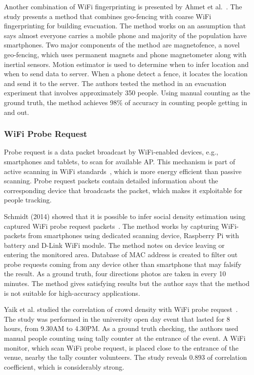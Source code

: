 	Another combination of WiFi fingerprinting is presented by Ahmet et al.~\cite{thesis045}. The study presents a method that combines geo-fencing with coarse WiFi fingerprinting for building evacuation. The method works on an assumption that says almost everyone carries a mobile phone and majority of the population have smartphones. Two major components of the method are magnetofence, a novel geo-fencing, which uses permanent magnets and phone magnetometer along with inertial sensors. Motion estimator is used to determine when to infer location and when to send data to server. When a phone detect a fence, it locates the location and send it to the server. The authors tested the method in an evacuation experiment that involves approximately 350 people. Using manual counting as the ground truth, the method achieves 98\% of accuracy in counting people getting in and out.
	


	\subsubsection{WiFi Probe Request} %
	\label{ssub:wifi_probe_request}
	Probe request is a data packet broadcast by WiFi-enabled devices, e.g., smartphones and tablets, to scan for available \ac{AP}. This mechanism is part of active scanning in WiFi standards~\cite{thesis082}, which is more energy efficient than passive scanning. Probe request packets contain detailed information about the corresponding device that broadcasts the packet, which makes it exploitable for people tracking.

	Schmidt (2014) showed that it is possible to infer social density estimation using captured WiFi probe request packets~\cite{thesis057}. The method works by capturing WiFi-packets from smartphones using dedicated scanning device, Raspberry Pi with battery and D-Link WiFi module. The method notes on device leaving or entering the monitored area. Database of \ac{MAC} address is created to filter out probe requests coming from any device other than smartphone that may falsify the result. As a ground truth, four directions photos are taken in every 10 minutes. The method gives satisfying results but the author says that the method is not suitable for high-accuracy applications.
	
	Yaik et al. studied the correlation of crowd density with WiFi probe request~\cite{thesis047}. The study was performed in the university open day event that lasted for 8 hours, from 9.30AM to 4.30PM. As a ground truth checking, the authors used manual people counting using tally counter at the entrance of the event. A WiFi monitor, which scan WiFi probe request, is placed close to the entrance of the venue, nearby the tally counter volunteers. The study reveals 0.893 of correlation coefficient, which is considerably strong.

